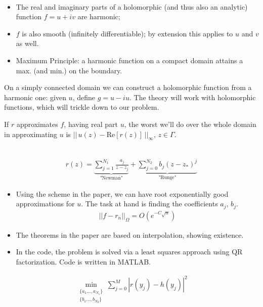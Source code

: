 \documentclass{seminar}
\begin{document}
\begin{slide} %
{} \small \\

\begin{itemize}
	\item The real and imaginary parts of a holomorphic (and thus also an analytic) function $f=u+iv$ are harmonic;
	\item $f$ is also smooth (infinitely differentiable); by extension this applies to $u$ and $v$ as well.
	\item Maximum Principle: a harmonic function on a compact domain attains a max. (and min.) on the boundary.
\end{itemize}

On a simply connected domain we can construct a holomorphic function from a harmonic one: given $u$, define $g=u-iu$. The theory will work with holomorphic functions, which will trickle down to our problem.

If $r$ approximates $f$, having real part $u$, the worst we'll do over the whole domain in approximating $u$ is $||\, u(z)-\mathrm{Re}[r(z)] \,||_\infty$, $z \in \Gamma$.
\end{slide} %




\begin{slide} %
{} \small \\
\begin{align*}
r(z) = \underbrace{\sum_{j=1}^{N_1} \frac{a_j}{z-z_j}}_\text{"Newman"} + \underbrace{\sum_{j=0}^{N_2} b_j (z-z_*)^j}_\text{"Runge"}
\end{align*}

\begin{itemize}
	\item Using the scheme in the paper, we can have root exponentially good approximations for $u$. The task at hand is finding the coefficients $a_j$, $b_j$.
	\begin{align*}
	||f-r_n||_\Omega = O(e^{-C\sqrt{n}})
	\end{align*}
	\item The theorems in the paper are based on interpolation, showing existence.
	\item In the code, the problem is solved via a least squares approach using QR factorization. Code is written in MATLAB.
\end{itemize}
\begin{align*}
\min_{\substack{\{a_1 \ldots ,a_{N_1}\} \\ \{b_1 \ldots ,b_{N_2}\}}} \sum_{j=0}^{M} {| r(y_j)-h(y_j) |}^2
\end{align*}
\end{slide} %
\end{document}
